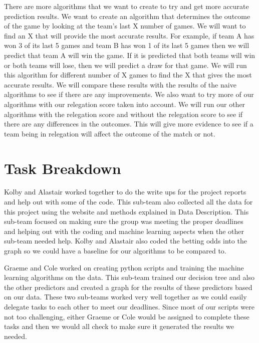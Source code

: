 \documentclass[conference]{IEEEtran}
\begin{document}
There are more algorithms that we want to create to try and get more accurate prediction results. We want to create an algorithm that determines the outcome of the game by looking at the team's last X number of games. We will want to find an X that will provide the most accurate results. For example, if team A has won 3 of its last 5 games and team B has won 1 of its last 5 games then we will predict that team A will win the game. If it is predicted that both teams will win or both teams will lose, then we will predict a draw for that game. We will run this algorithm for different number of X games to find the X that gives the most accurate results. We will compare these results with the results of the naive algorithms to see if there are any improvements.
We also want to try more of our algorithms with our relegation score taken into account. We will run our other algorithms with the relegation score and without the relegation score to see if there are any differences in the outcomes. This will give more evidence to see if a team being in relegation will affect the outcome of the match or not. 

\section{Task Breakdown}
Kolby and Alastair worked together to do the write ups for the project reports and help out with some of the code. This sub-team also collected all the data for this project using the website and methods explained in Data Description. This sub-team focused on making sure the group was meeting the proper deadlines and helping out with the coding and machine learning aspects when the other sub-team needed help. Kolby and Alastair also coded the betting odds into the graph so we could have a baseline for our algorithms to be compared to.

Graeme and Cole worked on creating python scripts and training the machine learning algorithms on the data. This sub-team trained our decision tree and also the other predictors and created a graph for the results of these predictors based on our data. These two sub-teams worked very well together as we could easily delegate tasks to each other to meet our deadlines. Since most of our scripts were not too challenging, either Graeme or Cole would be assigned to complete these tasks and then we would all check to make sure it generated the results we needed.
\end{document}
